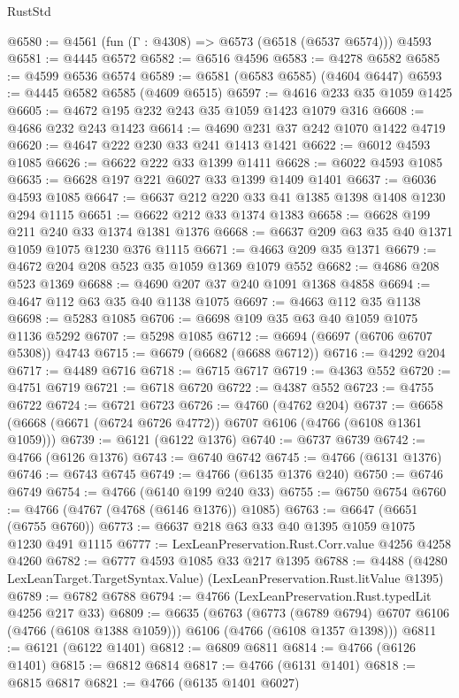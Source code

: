 \begin{lexlean}{RustStd}
\begin{coremodule}
@6580 := @4561 (fun (Γ : @4308) => @6573 (@6518 (@6537 @6574))) @4593
@6581 := @4445 @6572
@6582 := @6516 @4596
@6583 := @4278 @6582
@6585 := @4599 @6536 @6574
@6589 := @6581 (@6583 @6585) (@4604 @6447)
@6593 := @4445 @6582 @6585 (@4609 @6515)
@6597 := @4616 @233 @35 @1059 @1425
@6605 := @4672 @195 @232 @243 @35 @1059 @1423 @1079 @316
@6608 := @4686 @232 @243 @1423
@6614 := @4690 @231 @37 @242 @1070 @1422 @4719
@6620 := @4647 @222 @230 @33 @241 @1413 @1421
@6622 := @6012 @4593 @1085
@6626 := @6622 @222 @33 @1399 @1411
@6628 := @6022 @4593 @1085
@6635 := @6628 @197 @221 @6027 @33 @1399 @1409 @1401
@6637 := @6036 @4593 @1085
@6647 := @6637 @212 @220 @33 @41 @1385 @1398 @1408 @1230 @294 @1115
@6651 := @6622 @212 @33 @1374 @1383
@6658 := @6628 @199 @211 @240 @33 @1374 @1381 @1376
@6668 := @6637 @209 @63 @35 @40 @1371 @1059 @1075 @1230 @376 @1115
@6671 := @4663 @209 @35 @1371
@6679 := @4672 @204 @208 @523 @35 @1059 @1369 @1079 @552
@6682 := @4686 @208 @523 @1369
@6688 := @4690 @207 @37 @240 @1091 @1368 @4858
@6694 := @4647 @112 @63 @35 @40 @1138 @1075
@6697 := @4663 @112 @35 @1138
@6698 := @5283 @1085
@6706 := @6698 @109 @35 @63 @40 @1059 @1075 @1136 @5292
@6707 := @5298 @1085
@6712 := @6694 (@6697 (@6706 @6707 @5308)) @4743
@6715 := @6679 (@6682 (@6688 @6712))
@6716 := @4292 @204
@6717 := @4489 @6716
@6718 := @6715 @6717
@6719 := @4363 @552
@6720 := @4751 @6719
@6721 := @6718 @6720
@6722 := @4387 @552
@6723 := @4755 @6722
@6724 := @6721 @6723
@6726 := @4760 (@4762 @204)
@6737 := @6658 (@6668 (@6671 (@6724 @6726 @4772)) @6707 @6106 (@4766 (@6108 @1361 @1059)))
@6739 := @6121 (@6122 @1376)
@6740 := @6737 @6739
@6742 := @4766 (@6126 @1376)
@6743 := @6740 @6742
@6745 := @4766 (@6131 @1376)
@6746 := @6743 @6745
@6749 := @4766 (@6135 @1376 @240)
@6750 := @6746 @6749
@6754 := @4766 (@6140 @199 @240 @33)
@6755 := @6750 @6754
@6760 := @4766 (@4767 (@4768 (@6146 @1376)) @1085)
@6763 := @6647 (@6651 (@6755 @6760))
@6773 := @6637 @218 @63 @33 @40 @1395 @1059 @1075 @1230 @491 @1115
@6777 := LexLeanPreservation.Rust.Corr.value @4256 @4258 @4260
@6782 := @6777 @4593 @1085 @33 @217 @1395
@6788 := @4488 (@4280 LexLeanTarget.TargetSyntax.Value) (LexLeanPreservation.Rust.litValue @1395)
@6789 := @6782 @6788
@6794 := @4766 (LexLeanPreservation.Rust.typedLit @4256 @217 @33)
@6809 := @6635
    (@6763
      (@6773 (@6789 @6794) @6707 @6106 (@4766 (@6108 @1388 @1059)))
      @6106
      (@4766 (@6108 @1357 @1398)))
@6811 := @6121 (@6122 @1401)
@6812 := @6809 @6811
@6814 := @4766 (@6126 @1401)
@6815 := @6812 @6814
@6817 := @4766 (@6131 @1401)
@6818 := @6815 @6817
@6821 := @4766 (@6135 @1401 @6027)

\end{coremodule}
\end{lexlean}
